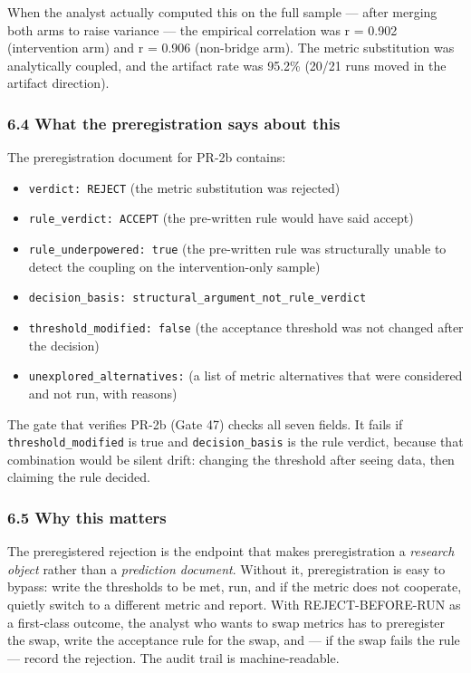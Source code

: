 \documentclass[
]{article}
\providecommand{\tightlist}{%
  \setlength{\itemsep}{0pt}\setlength{\parskip}{0pt}}
\begin{document}
When the analyst actually computed this on the full sample --- after
merging both arms to raise variance --- the empirical correlation was
\textbar r\textbar{} = 0.902 (intervention arm) and \textbar r\textbar{}
= 0.906 (non-bridge arm). The metric substitution was analytically
coupled, and the artifact rate was 95.2\% (20/21 runs moved in the
artifact direction).

\subsubsection{6.4 What the preregistration says about
this}\label{what-the-preregistration-says-about-this}

The preregistration document for PR-2b contains:

\begin{itemize}
\tightlist
\item
  \texttt{verdict:\ REJECT} (the metric substitution was rejected)
\item
  \texttt{rule\_verdict:\ ACCEPT} (the pre-written rule would have said
  accept)
\item
  \texttt{rule\_underpowered:\ true} (the pre-written rule was
  structurally unable to detect the coupling on the intervention-only
  sample)
\item
  \texttt{decision\_basis:\ structural\_argument\_not\_rule\_verdict}
\item
  \texttt{threshold\_modified:\ false} (the acceptance threshold was not
  changed after the decision)
\item
  \texttt{unexplored\_alternatives:} (a list of metric alternatives that
  were considered and not run, with reasons)
\end{itemize}

The gate that verifies PR-2b (Gate 47) checks all seven fields. It fails
if \texttt{threshold\_modified} is true and \texttt{decision\_basis} is
the rule verdict, because that combination would be silent drift:
changing the threshold after seeing data, then claiming the rule
decided.

\subsubsection{6.5 Why this matters}\label{why-this-matters}

The preregistered rejection is the endpoint that makes preregistration a
\emph{research object} rather than a \emph{prediction document}. Without
it, preregistration is easy to bypass: write the thresholds to be met,
run, and if the metric does not cooperate, quietly switch to a different
metric and report. With REJECT-BEFORE-RUN as a first-class outcome, the
analyst who wants to swap metrics has to preregister the swap, write the
acceptance rule for the swap, and --- if the swap fails the rule ---
record the rejection. The audit trail is machine-readable.
\end{document}
